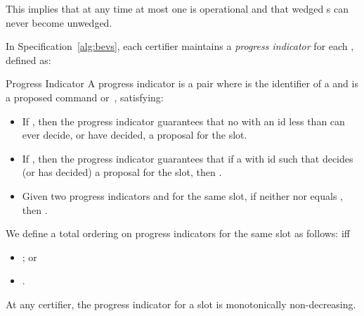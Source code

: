 \noindent
This implies that at any time at most one {\round} is operational and that
wedged {\round}s can never become unwedged.

\begin{comment}
An operational {\round} has exactly one certifier that is designated
as \emph{coordinator}---this certifier handles the recovery part of the protocol (Section~\ref{sec:recovery}).
\end{comment}

\label{sec:progind}

In Specification~\ref{alg:bevs}, each certifier  maintains a
\emph{progress indicator}  for each , defined as:

\begin{definition}{Progress Indicator}
A progress indicator is a pair 
where  is the identifier of a {\round} and  is a proposed command
or~, satisfying:

\begin{itemize}\item If , then the progress indicator guarantees that no {\round}
with an id less than  can ever decide, or have decided, a proposal
for the slot.
\item If , then the progress indicator guarantees that
if a {\round} with id  such that  decides
(or has decided) a proposal  for the slot, then .
\item Given two progress indicators  and
 for the same slot, if neither  nor
 equals , then .
\end{itemize}
\end{definition}

\noindent
We define a total ordering  on
progress indicators for the same slot as follows:
 iff
\begin{itemize}\item ; or
\item .
\end{itemize}

\noindent
At any certifier, the progress indicator for a slot is monotonically
non-decreasing.





